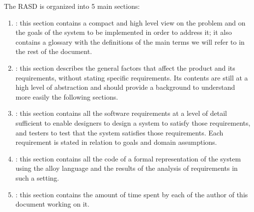 The RASD is organized into 5 main sections:

\begin{enumerate}
\item {\textbf{}}: this section contains a compact and high level view on the problem and on the goals of the system to be implemented in order to address it; it also contains a glossary with the definitions of the main terms we will refer to in the rest of the document.
\item {\textbf{}}: this section  describes the general factors that affect the product and its requirements, without stating specific requirements. Its contents are still at a high level of abstraction and should provide a background to understand more easily the following sections.
\item {\textbf{}}: this section contains all the software requirements at a level of detail sufficient to enable designers to design a system to satisfy those requirements, and testers to test that the system satisfies those requirements. Each requirement is stated in relation to goals and domain assumptions.
\item {\textbf{}}: this section contains all the code of a formal representation of the system using the alloy language and the results of the analysis of requirements in such a setting.
\item {\textbf{}}: this section contains the amount of time spent by each of the author of this document working on it.
\end{enumerate}